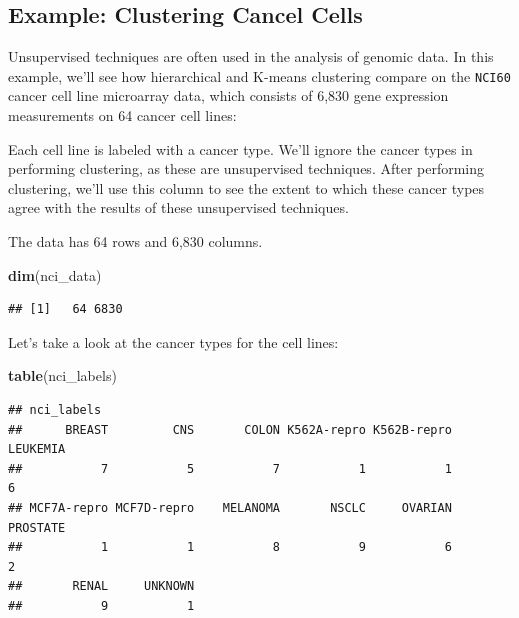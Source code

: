 \documentclass[openany]{book}
\newenvironment{Shaded}{\begin{snugshade}}{\end{snugshade}}
\newcommand{\CommentTok}[1]{\textcolor[rgb]{0.56,0.35,0.01}{\textit{#1}}}
\newcommand{\KeywordTok}[1]{\textcolor[rgb]{0.13,0.29,0.53}{\textbf{#1}}}
\newcommand{\NormalTok}[1]{#1}
\newcommand{\OperatorTok}[1]{\textcolor[rgb]{0.81,0.36,0.00}{\textbf{#1}}}
\newcommand{\StringTok}[1]{\textcolor[rgb]{0.31,0.60,0.02}{#1}}
\begin{document}
\hypertarget{example-clustering-cancel-cells}{%
\subsection{Example: Clustering Cancel Cells}\label{example-clustering-cancel-cells}}

Unsupervised techniques are often used in the analysis of genomic data. In this example, we'll see how hierarchical and K-means clustering compare on the \texttt{NCI60} cancer cell line microarray data, which
consists of 6,830 gene expression measurements on 64 cancer cell lines:

\begin{Shaded}
\end{Shaded}

Each cell line is labeled with a cancer type. We'll ignore the
cancer types in performing clustering, as these are unsupervised
techniques. After performing clustering, we'll use this column to see the extent to which these cancer types agree with the results of these
unsupervised techniques.

The data has 64 rows and 6,830 columns.

\begin{Shaded}
\begin{Highlighting}[]
\KeywordTok{dim}\NormalTok{(nci_data)}
\end{Highlighting}
\end{Shaded}

\begin{verbatim}
## [1]   64 6830
\end{verbatim}

Let's take a look at the cancer types for the cell lines:

\begin{Shaded}
\begin{Highlighting}[]
\KeywordTok{table}\NormalTok{(nci_labels)}
\end{Highlighting}
\end{Shaded}

\begin{verbatim}
## nci_labels
##      BREAST         CNS       COLON K562A-repro K562B-repro    LEUKEMIA 
##           7           5           7           1           1           6 
## MCF7A-repro MCF7D-repro    MELANOMA       NSCLC     OVARIAN    PROSTATE 
##           1           1           8           9           6           2 
##       RENAL     UNKNOWN 
##           9           1
\end{verbatim}
\end{document}

